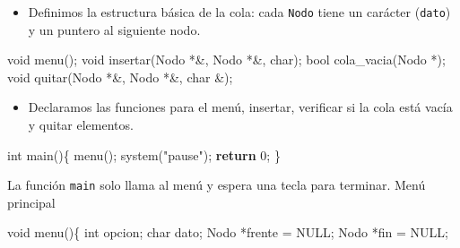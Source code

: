 \documentclass[
  11pt,
  a4paper,
  DIV=11,
  numbers=noendperiod]{scrreprt}
\newenvironment{Shaded}{\begin{snugshade}}{\end{snugshade}}
\newcommand{\ControlFlowTok}[1]{\textcolor[rgb]{0.00,0.23,0.31}{\textbf{#1}}}
\newcommand{\DataTypeTok}[1]{\textcolor[rgb]{0.68,0.00,0.00}{#1}}
\newcommand{\DecValTok}[1]{\textcolor[rgb]{0.68,0.00,0.00}{#1}}
\newcommand{\NormalTok}[1]{\textcolor[rgb]{0.00,0.23,0.31}{#1}}
\newcommand{\OperatorTok}[1]{\textcolor[rgb]{0.37,0.37,0.37}{#1}}
\newcommand{\StringTok}[1]{\textcolor[rgb]{0.13,0.47,0.30}{#1}}
\providecommand{\tightlist}{%
  \setlength{\itemsep}{0pt}\setlength{\parskip}{0pt}}
\begin{document}
\begin{itemize}
\tightlist
\item
  Definimos la estructura básica de la cola: cada \texttt{Nodo} tiene un
  carácter (\texttt{dato}) y un puntero al siguiente nodo.
\end{itemize}

\begin{Shaded}
\begin{Highlighting}[]
\DataTypeTok{void}\NormalTok{ menu}\OperatorTok{();}
\DataTypeTok{void}\NormalTok{ insertar}\OperatorTok{(}\NormalTok{Nodo }\OperatorTok{*\&,}\NormalTok{ Nodo }\OperatorTok{*\&,} \DataTypeTok{char}\OperatorTok{);}
\DataTypeTok{bool}\NormalTok{ cola\_vacia}\OperatorTok{(}\NormalTok{Nodo }\OperatorTok{*);}
\DataTypeTok{void}\NormalTok{ quitar}\OperatorTok{(}\NormalTok{Nodo }\OperatorTok{*\&,}\NormalTok{ Nodo }\OperatorTok{*\&,} \DataTypeTok{char} \OperatorTok{\&);}
\end{Highlighting}
\end{Shaded}

\begin{itemize}
\tightlist
\item
  Declaramos las funciones para el menú, insertar, verificar si la cola
  está vacía y quitar elementos.
\end{itemize}

\begin{Shaded}
\begin{Highlighting}[]
\DataTypeTok{int}\NormalTok{ main}\OperatorTok{()\{}
\NormalTok{    menu}\OperatorTok{();}
\NormalTok{    system}\OperatorTok{(}\StringTok{"pause"}\OperatorTok{);}
    \ControlFlowTok{return} \DecValTok{0}\OperatorTok{;}
\OperatorTok{\}}
\end{Highlighting}
\end{Shaded}

La función \texttt{main} solo llama al menú y espera una tecla para
terminar. Menú principal

\begin{Shaded}
\begin{Highlighting}[]
\DataTypeTok{void}\NormalTok{ menu}\OperatorTok{()\{}
    \DataTypeTok{int}\NormalTok{ opcion}\OperatorTok{;}
    \DataTypeTok{char}\NormalTok{ dato}\OperatorTok{;}
\NormalTok{    Nodo }\OperatorTok{*}\NormalTok{frente }\OperatorTok{=}\NormalTok{ NULL}\OperatorTok{;}
\NormalTok{    Nodo }\OperatorTok{*}\NormalTok{fin }\OperatorTok{=}\NormalTok{ NULL}\OperatorTok{;}
\end{Highlighting}
\end{Shaded}
\end{document}
